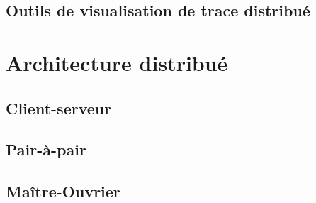 


\subsection{Outils de visualisation de trace distribué}


\section{Architecture distribué}

\subsection{Client-serveur}

\subsection{Pair-à-pair} 

\subsection{Maître-Ouvrier}


